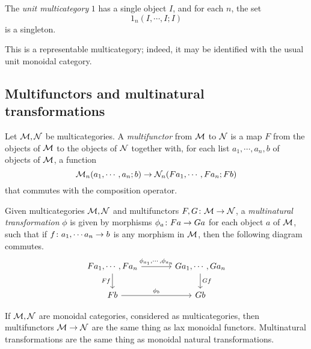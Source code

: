 \documentclass{article}
\begin{document}
\begin{definition}
  The \emph{unit multicategory} $1$ has a single object $I$, and for each $n$, the set
  \[
    1_n(I,\cdots,I;I)
    \]
  is a singleton.

  This is a representable multicategory; indeed, it may be identified with the usual unit monoidal category.
\end{definition}

\subsection{Multifunctors and multinatural transformations}

\begin{definition}
  Let $\mathcal M,\mathcal N$ be multicategories.  
  A \emph{multifunctor} from $\mathcal M$ to $\mathcal N$ is a map $F$ from the objects of $\mathcal M$ to the objects of $\mathcal N$ together with, for each list $a_1,\cdots,a_n,b$ of objects of $\mathcal M$, a function
  \[
    \mathcal M_n(a_1,\cdots,a_n;b) \to \mathcal N_n(F a_1,\cdots,F a_n; F b)
    \]
  that commutes with the composition operator.
\end{definition}
  
\begin{definition}
  Given multicategories $\mathcal M,\mathcal N$ and multifunctors $F,G\colon \mathcal M \to \mathcal N$, a \emph{multinatural transformation} $\phi$ is given by morphisms $\phi_a \colon F a \to G a$ for each object $a$ of $\mathcal M$, such that if $f\colon a_1,\cdots a_n\to b$ is any morphism in $\mathcal M$, then the following diagram commutes.
  \[
    \begin{tikzcd}[column sep=36pt]
      Fa_1,\cdots, Fa_n \arrow[r, "{\phi_{a_1},\cdots,\phi_{a_n}}"] \arrow[d, "Ff"']
        & Ga_1,\cdots, Ga_n \arrow[d, "Gf"] \\
      Fb \arrow[r, "\phi_b"]
        & Gb
    \end{tikzcd}
    \]
\end{definition}

\begin{proposition}
  If $\mathcal M,\mathcal N$ are monoidal categories, considered as multicategories, then multifunctors $\mathcal M\to\mathcal N$ are the same thing as lax monoidal functors.  
  Multinatural transformations are the same thing as monoidal natural transformations.
\end{proposition}
\end{document}

